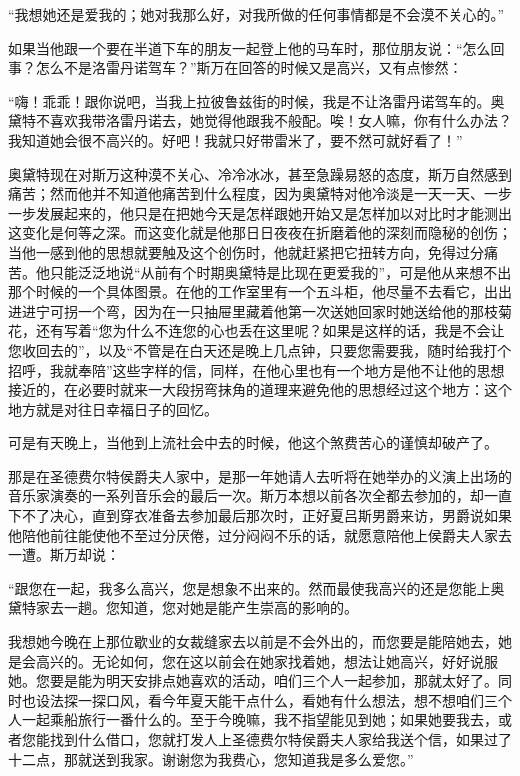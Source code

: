 \par “我想她还是爱我的；她对我那么好，对我所做的任何事情都是不会漠不关心的。”
\par 如果当他跟一个要在半道下车的朋友一起登上他的马车时，那位朋友说：“怎么回事？怎么不是洛雷丹诺驾车？”斯万在回答的时候又是高兴，又有点惨然：
\par “嗨！乖乖！跟你说吧，当我上拉彼鲁兹街的时候，我是不让洛雷丹诺驾车的。奥黛特不喜欢我带洛雷丹诺去，她觉得他跟我不般配。唉！女人嘛，你有什么办法？我知道她会很不高兴的。好吧！我就只好带雷米了，要不然可就好看了！”
\par 奥黛特现在对斯万这种漠不关心、冷冷冰冰，甚至急躁易怒的态度，斯万自然感到痛苦；然而他并不知道他痛苦到什么程度，因为奥黛特对他冷淡是一天一天、一步一步发展起来的，他只是在把她今天是怎样跟她开始又是怎样加以对比时才能测出这变化是何等之深。而这变化就是他那日日夜夜在折磨着他的深刻而隐秘的创伤；当他一感到他的思想就要触及这个创伤时，他就赶紧把它扭转方向，免得过分痛苦。他只能泛泛地说“从前有个时期奥黛特是比现在更爱我的”，可是他从来想不出那个时候的一个具体图景。在他的工作室里有一个五斗柜，他尽量不去看它，出出进进宁可拐一个弯，因为在一只抽屉里藏着他第一次送她回家时她送给他的那枝菊花，还有写着“您为什么不连您的心也丢在这里呢？如果是这样的话，我是不会让您收回去的”，以及“不管是在白天还是晚上几点钟，只要您需要我，随时给我打个招呼，我就奉陪”这些字样的信，同样，在他心里也有一个地方是他不让他的思想接近的，在必要时就来一大段拐弯抹角的道理来避免他的思想经过这个地方：这个地方就是对往日幸福日子的回忆。
\par 可是有天晚上，当他到上流社会中去的时候，他这个煞费苦心的谨慎却破产了。
\par 那是在圣德费尔特侯爵夫人家中，是那一年她请人去听将在她举办的义演上出场的音乐家演奏的一系列音乐会的最后一次。斯万本想以前各次全都去参加的，却一直下不了决心，直到穿衣准备去参加最后那次时，正好夏吕斯男爵来访，男爵说如果他陪他前往能使他不至过分厌倦，过分闷闷不乐的话，就愿意陪他上侯爵夫人家去一遭。斯万却说：
\par “跟您在一起，我多么高兴，您是想象不出来的。然而最使我高兴的还是您能上奥黛特家去一趟。您知道，您对她是能产生崇高的影响的。
\par 我想她今晚在上那位歇业的女裁缝家去以前是不会外出的，而您要是能陪她去，她是会高兴的。无论如何，您在这以前会在她家找着她，想法让她高兴，好好说服她。您要是能为明天安排点她喜欢的活动，咱们三个人一起参加，那就太好了。同时也设法探一探口风，看今年夏天能干点什么，看她有什么想法，想不想咱们三个人一起乘船旅行一番什么的。至于今晚嘛，我不指望能见到她；如果她要我去，或者您能找到什么借口，您就打发人上圣德费尔特侯爵夫人家给我送个信，如果过了十二点，那就送到我家。谢谢您为我费心，您知道我是多么爱您。”
